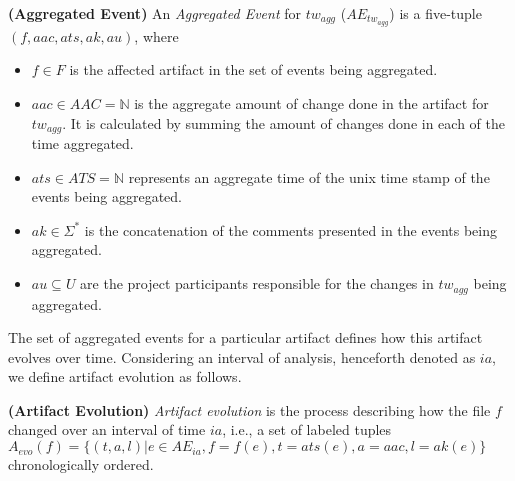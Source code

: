 \begin{definition} {\bf (Aggregated Event)}
\label{def_aggregateEvent}
An \emph{Aggregated Event} for $tw_{agg}$ ($AE_{tw_{agg}}$) is a five-tuple $(f, aac, ats, ak,au)$, where
\begin{itemize}
\item $f \in F$ is the affected artifact in the set of events being aggregated.
\item $aac \in AAC =  \mathbb{N}$ is the aggregate amount of change done in the artifact for $tw_{agg}$. It is calculated by summing the amount of changes done in each of the time aggregated.
\item $ats \in ATS = \mathbb{N}$ represents an aggregate time of the unix time stamp of the events being aggregated.
\item $ak \in \Sigma ^* $ is the concatenation of the comments presented in the events being aggregated.
\item $au \subseteq U$ are the project participants responsible for the changes in $tw_{agg}$ being aggregated.
\end{itemize}
\end{definition}

The set of aggregated events for a particular artifact defines how this artifact evolves over time. Considering an interval of analysis, henceforth denoted as $ia$, we define artifact evolution as follows.

\begin{definition} {\bf (Artifact Evolution)}
\emph{Artifact evolution} is the process describing how the file $f$ changed over an interval of time $ia$, i.e., a set of labeled tuples $A_{evo}(f) = \{ (t,a,l) | e \in AE_{ia}, f=f(e), t=ats(e), a=aac, l=ak(e)\}$ chronologically ordered.

\end{definition}

